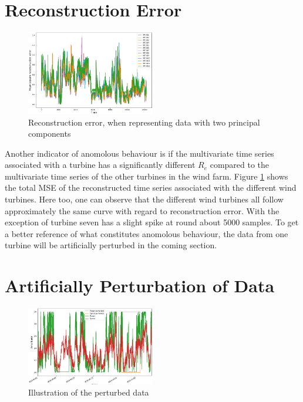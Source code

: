 \section{Reconstruction Error}

\begin{figure}[h]
    \begin{center}
    \includegraphics[width=0.5\textwidth]{data_exp/reconstruction_error}
    \end{center}
    \caption{Reconstruction error, when representing data with two principal components} 
    \label{fig:recon_error}
\end{figure}

Another indicator of anomolous behaviour is if the multivariate time series associated with a turbine has a significantly different $R_e$ compared to the multivariate time series of the other turbines in the wind farm. 
Figure \ref{fig:recon_error} shows the total MSE of the reconstructed time series associated with the different wind turbines. 
Here too, one can observe that the different wind turbines all follow approximately the same curve with regard to reconstruction error. 
With the exception of turbine seven has a slight spike at round about 5000 samples. 
To get a better reference of what constitutes anomolous behaviour, the data from one turbine will be artificially perturbed in the coming section. 

\section{Artificially Perturbation of Data}

\begin{figure}
    \begin{center}
    \includegraphics[width=0.5\textwidth]{data_exp/perturbed_vs_unperturbed}
    \end{center}
    \caption{Illustration of the perturbed data} 
    \label{fig:illu_perturbed_data}
\end{figure}

